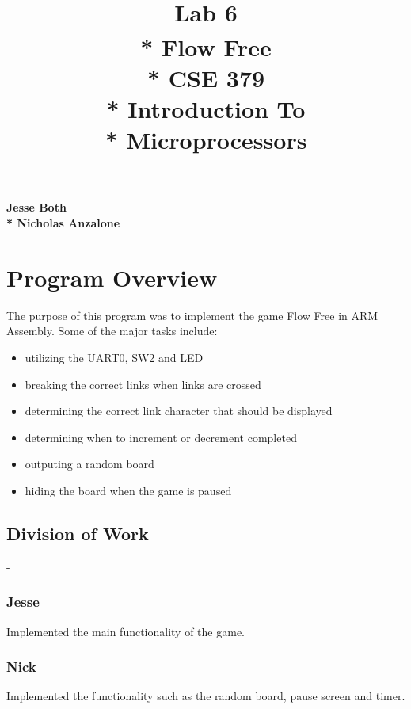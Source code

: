 \documentclass{article}
\title{\Huge{\textbf{Lab 6 \\* Flow Free}\textsuperscript{\small\textregistered}
                        \\*  CSE 379 \\* Introduction To \\* Microprocessors}}
\date{} %
\begin{document}
    \maketitle
    \vfill 
    {\Large\centering\textbf{Jesse Both \\* Nicholas Anzalone}\par}
    {\large{}\par}
    {\large\centering{\today}\par}
    \newpage
    \begin{center}
        \tableofcontents
    \end{center}
\newpage
\setcounter{secnumdepth}{-1}


\section{Program Overview}
The purpose of this program was to implement the game
Flow Free in ARM Assembly. Some of the major tasks include:

    \begin{itemize}
        \item utilizing the UART0, SW2 and LED 
        \item breaking the correct links when links are crossed 
        \item determining the correct link character that should be displayed
        \item determining when to increment or decrement completed
        \item outputing a random board 
        \item hiding the board when the game is paused
    \end{itemize}

\subsection{Division of Work}
-
\subsubsection{Jesse}
    Implemented the main functionality of the game.
\subsubsection{Nick}
    Implemented the functionality such as the random
    board, pause screen and timer.
\end{document}
